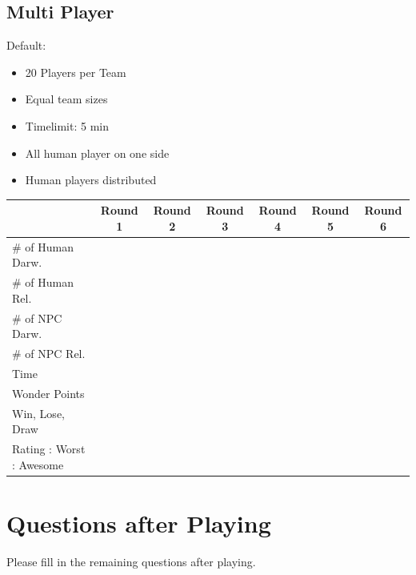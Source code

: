 \documentclass[11pt,a4paper,titlepage,table]{article}
\begin{document}
\subsection{Multi Player}
Default:
\begin{itemize}
	\item 20 Players per Team
	\item Equal team sizes
	\item Timelimit: 5 min
	\item All human player on one side
	\item Human players distributed
\end{itemize}
\begin{table}[H]
\begin{tabularx}{1.1\textwidth}{|X|S|S|S|S|S|S|}
	\hline 
		& Round 1 & Round 2 & Round 3 & Round 4 & Round 5 & Round 6\\
  	\hline
  		\# of Human Darw. &  & &  & &  &  \\
  	\hline
	  	\# of Human Rel. &  & &  & &  &  \\
  	\hline
	  	\# of NPC Darw. &  & &  & &  &  \\
  	\hline
  		\# of NPC Rel.  & & &  & & & \\
  	\hline
	  	Time  & & &  & & & \\
  	\hline
	  	Wonder Points  & & &  & & & \\
  	\hline
	  	Win, Lose, Draw & & &  & & & \\
  	\hline
	  	Rating : Worst : Awesome & & &  & & & \\
  	
  	\hline
\end{tabularx}
\end{table}

\section{Questions after Playing}

Please fill in the remaining questions after playing.
\end{document}

